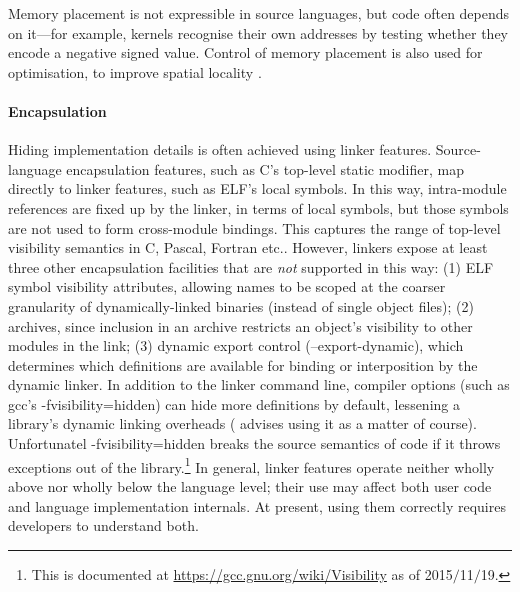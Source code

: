 Memory placement is not expressible in source languages, 
but code often depends on it---for example, kernels recognise their own addresses
by testing whether they encode a negative signed value.
Control of memory placement is also used for optimisation, 
to improve spatial locality \citep{orr_fast_1993}.


\paragraph{Encapsulation}
Hiding implementation details is often achieved using linker features. 
Source-language encapsulation features, such as C's top-level \textsf{static} modifier, 
map directly to linker features, such as ELF's local symbols.
In this way, intra-module references are fixed up by the linker, in terms of local symbols, 
but those symbols are not used to form cross-module bindings.
This captures the range of top-level visibility semantics in C, Pascal, Fortran etc..
However, linkers expose at least three other encapsulation facilities
that are \emph{not} supported in this way: (1) ELF symbol visibility attributes,
allowing names to be scoped at the coarser granularity of 
dynamically-linked binaries (instead of single object files);
(2) archives,
since inclusion in an archive restricts an object's visibility 
to other modules in the link;
(3) dynamic export control (\textsf{--export-dynamic}), which determines 
which definitions are available for binding or interposition by the dynamic linker.
In addition to the linker command line, 
compiler options (such as \textsf{gcc}'s \textsf{-fvisibility=hidden})
can hide more definitions by default, lessening a library's dynamic linking overheads
(\citet{drepper_how_2011} advises using it as a matter of course).
Unfortunatel \textsf{-fvisibility=hidden} breaks the source semantics of \Cplusplus{} code 
if it throws exceptions out of the library.\footnote{This is documented at \url{https://gcc.gnu.org/wiki/Visibility}
as of 2015$/$11$/$19.}
In general, linker features operate neither wholly above nor wholly below the language level; 
their use may affect both user code and language implementation internals.
At present, using them correctly requires developers to understand both.


